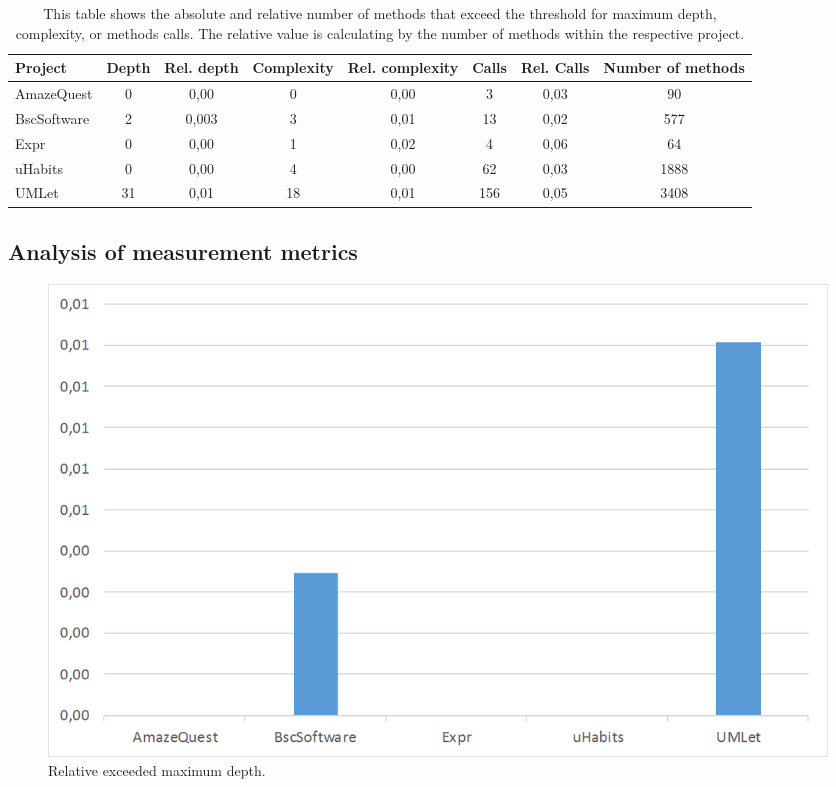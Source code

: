 \documentclass[conference]{IEEEtran}
\begin{document}
\begin{table}
\centering
\begin{tabular}{l|c c c c c c c}
	Project     & Depth & Rel. depth & Complexity & Rel. complexity & Calls & Rel. Calls & Number of methods \\ \hline
	AmazeQuest  &   0   & 0,00       & 0          & 0,00            & 3     & 0,03       & 90                \\
	BscSoftware &   2   & 0,003      & 3          & 0,01            & 13    & 0,02       & 577               \\
	Expr        &   0   & 0,00       & 1          & 0,02            & 4     & 0,06       & 64                \\
	uHabits     &   0   & 0,00       & 4          & 0,00            & 62    & 0,03       & 1888              \\
	UMLet       &  31   & 0,01       & 18         & 0,01            & 156   & 0,05       & 3408
\end{tabular} 
\caption{This table shows the absolute and relative number of methods that exceed the threshold for maximum depth, complexity, or methods calls. The relative value is calculating by the number of methods within the respective project.}
\label{tbl:exceed}
\end{table}

\subsection{Analysis of measurement metrics}
\begin{figure}
\includegraphics[width=\columnwidth]{img/rel_exceeded_depth.png}
\caption{Relative exceeded maximum depth.}
\label{fig:exceed_depth}
\end{figure}
\end{document}
